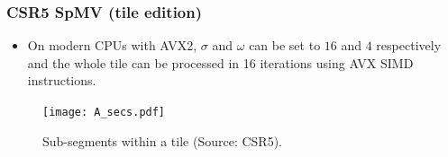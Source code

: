 \documentclass{beamer}
\begin{document}
\begin{frame}
    \frametitle{CSR5 SpMV (tile edition)}

    \begin{itemize}
        \item On modern CPUs with AVX2, \(\sigma\) and \(\omega\) can be set to $16$ and $4$ respectively and the whole tile can be
              processed in 16 iterations using AVX SIMD instructions.
    \end{itemize}

    \begin{figure}[htp]
        \centering
        \texttt{[image: A\_secs.pdf]}
        \caption{Sub-segments within a tile (Source: CSR5).}
    \end{figure}
\end{frame}
\end{document}
